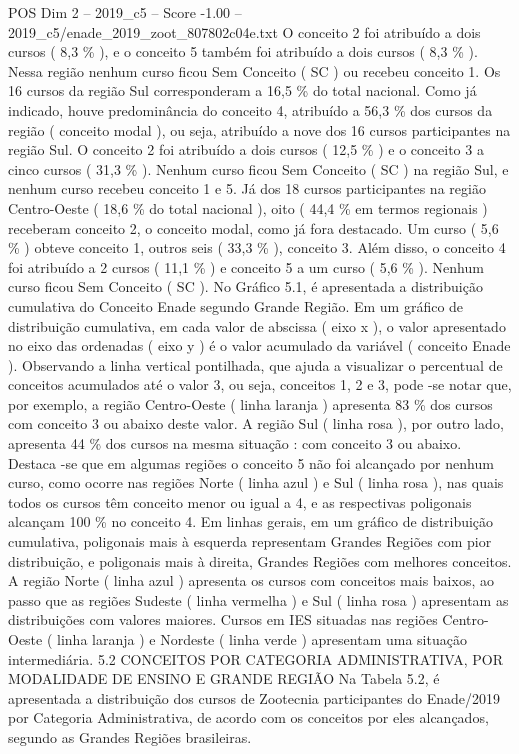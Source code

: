 \begin{textsample}{POS Dim 2 – 2019\_c5 – Score -1.00 – 2019\_c5/enade\_2019\_zoot\_807802c04e.txt}
O conceito 2 foi atribuído a dois cursos ( 8,3 \% ), e o conceito 5 também foi atribuído a dois cursos ( 8,3 \% ).
Nessa região nenhum curso ficou Sem Conceito ( SC ) ou recebeu conceito 1.
Os 16 cursos da região Sul corresponderam a 16,5 \% do total nacional.
Como já indicado, houve predominância do conceito 4, atribuído a 56,3 \% dos cursos da região ( conceito modal ), ou seja, atribuído a nove dos 16 cursos participantes na região Sul.
O conceito 2 foi atribuído a dois cursos ( 12,5 \% ) e o conceito 3 a cinco cursos ( 31,3 \% ).
Nenhum curso ficou Sem Conceito ( SC ) na região Sul, e nenhum curso recebeu conceito 1 e 5.
Já dos 18 cursos participantes na região Centro-Oeste ( 18,6 \% do total nacional ), oito ( 44,4 \% em termos regionais ) receberam conceito 2, o conceito modal, como já fora destacado.
Um curso ( 5,6 \% ) obteve conceito 1, outros seis ( 33,3 \% ), conceito 3.
Além disso, o conceito 4 foi atribuído a 2 cursos ( 11,1 \% ) e conceito 5 a um curso ( 5,6 \% ).
Nenhum curso ficou Sem Conceito ( SC ).
No Gráfico 5.1, é apresentada a distribuição cumulativa do Conceito Enade segundo Grande Região.
Em um gráfico de distribuição cumulativa, em cada valor de abscissa ( eixo x ), o valor apresentado no eixo das ordenadas ( eixo y ) é o valor acumulado da variável ( conceito Enade ).
Observando a linha vertical pontilhada, que ajuda a visualizar o percentual de conceitos acumulados até o valor 3, ou seja, conceitos 1, 2 e 3, pode -se notar que, por exemplo, a região Centro-Oeste ( linha laranja ) apresenta 83 \% dos cursos com conceito 3 ou abaixo deste valor.
A região Sul ( linha rosa ), por outro lado, apresenta 44 \% dos cursos na mesma situação : com conceito 3 ou abaixo.
Destaca -se que em algumas regiões o conceito 5 não foi alcançado por nenhum curso, como ocorre nas regiões Norte ( linha azul ) e Sul ( linha rosa ), nas quais todos os cursos têm conceito menor ou igual a 4, e as respectivas poligonais alcançam 100 \% no conceito 4.
Em linhas gerais, em um gráfico de distribuição cumulativa, poligonais mais à esquerda representam Grandes Regiões com pior distribuição, e poligonais mais à direita, Grandes Regiões com melhores conceitos.
A região Norte ( linha azul ) apresenta os cursos com conceitos mais baixos, ao passo que as regiões Sudeste ( linha vermelha ) e Sul ( linha rosa ) apresentam as distribuições com valores maiores.
Cursos em IES situadas nas regiões Centro-Oeste ( linha laranja ) e Nordeste ( linha verde ) apresentam uma situação intermediária. 5.2 CONCEITOS POR CATEGORIA ADMINISTRATIVA, POR MODALIDADE DE ENSINO E GRANDE REGIÃO Na Tabela 5.2, é apresentada a distribuição dos cursos de Zootecnia participantes do Enade/2019 por Categoria Administrativa, de acordo com os conceitos por eles alcançados, segundo as Grandes Regiões brasileiras.

\end{textsample}
